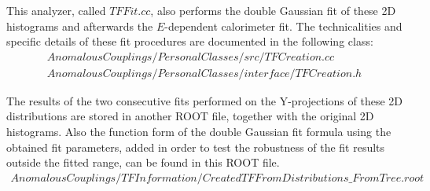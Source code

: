 This analyzer, called $TFFit.cc$, also performs the double Gaussian fit of these 2D histograms and afterwards the $E$-dependent calorimeter fit. The technicalities and specific details of these fit procedures are documented in the following class:
\begin{eqnarray*}
 AnomalousCouplings/PersonalClasses/src/TFCreation.cc \\
 AnomalousCouplings/PersonalClasses/interface/TFCreation.h
\end{eqnarray*}

The results of the two consecutive fits performed on the Y-projections of these 2D distributions are stored in another ROOT file, together with the original 2D histograms. Also the function form of the double Gaussian fit formula using the obtained fit parameters, added in order to test the robustness of the fit results outside the fitted range, can be found in this ROOT file.
\begin{eqnarray*}
 AnomalousCouplings/TFInformation/CreatedTFFromDistributions\_FromTree.root
\end{eqnarray*}

